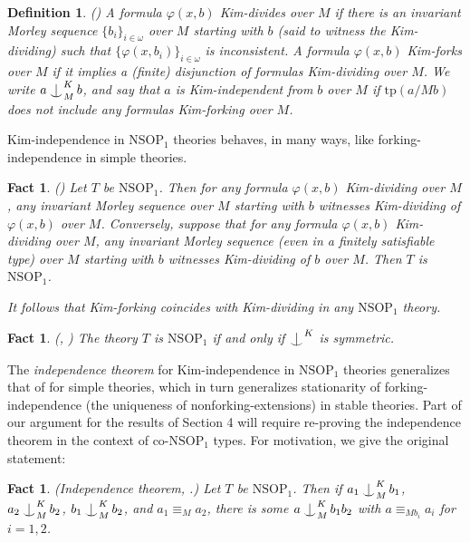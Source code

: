 \documentclass[12pt]{amsart}
\newtheorem{fact}[theorem]{Fact}
\newtheorem{definition}{Definition}[section]
\theoremstyle{definition}
\def\Ind#1#2{#1\setbox0=\hbox{$#1x$}\kern\wd0\hbox to 0pt{\hss$#1\mid$\hss}
\lower.9\ht0\hbox to 0pt{\hss$#1\smile$\hss}\kern\wd0}
\def\ind{\mathop{\mathpalette\Ind{}}}
\begin{document}
\begin{definition}(\cite{KR17})
A formula $\varphi(x, b)$ \emph{Kim-divides} over $M$ if there is an invariant Morley sequence $\{b_{i}\}_{i \in \omega}$ over $M$ starting with $b$ (said to \emph{witness} the Kim-dividing) such that $\{\varphi(x, b_{i})\}_{i \in \omega}$ is inconsistent. A formula  $\varphi(x, b)$ \emph{Kim-forks} over $M$ if it implies a (finite) disjunction of formulas Kim-dividing over $M$. We write $a \ind^{K}_{M} b$, and say that $a$ is \emph{Kim-independent} from $b$ over $M$ if $\mathrm{tp}(a/Mb)$ does not include any formulas Kim-forking over $M$.
\end{definition}

Kim-independence in $\mathrm{NSOP}_{1}$ theories behaves, in many ways, like forking-independence in simple theories.

\begin{fact}\label{4-kimslemma}
(\cite{KR17}) Let $T$ be $\mathrm{NSOP}_{1}$. Then for any formula $\varphi(x,b)$ Kim-dividing over $M$, any invariant Morley sequence over $M$ starting with $b$ witnesses Kim-dividing of $\varphi(x, b)$ over $M$. Conversely, suppose that for any formula $\varphi(x,b)$ Kim-dividing over $M$, any invariant Morley sequence (even in a finitely satisfiable type) over $M$ starting with $b$ witnesses Kim-dividing of $b$ over $M$. Then $T$ is $\mathrm{NSOP}_{1}$.

It follows that Kim-forking coincides with Kim-dividing in any $\mathrm{NSOP}_{1}$ theory.
\end{fact}

\begin{fact}\label{4-symmetry}
(\cite{CR15}, \cite{KR17}) The theory $T$ is $\mathrm{NSOP}_{1}$ if and only if $\ind^{K}$ is symmetric.
\end{fact}

The \textit{independence theorem} for Kim-independence in $\mathrm{NSOP}_{1}$ theories generalizes that of \cite{KP99} for simple theories, which in turn generalizes stationarity of forking-independence (the uniqueness of nonforking-extensions) in stable theories. Part of our argument for the results of Section 4 will require re-proving the independence theorem in the context of co-$\mathrm{NSOP}_{1}$ types. For motivation, we give the original statement:

\begin{fact}\label{4-independence}(\emph{Independence theorem, \cite{KR17}.})
    Let $T$ be $\mathrm{NSOP}_{1}$. Then if   $a_{1} \ind^{K}_{M} b_{1}$, $a_{2} \ind^{K}_{M} b_{2}$, $b_{1} \ind^{K}_{M} b_{2}$, and $a_{1} \equiv_{M} a_{2}$, there is some $a \ind^{K}_{M} b_{1}b_{2}$ with $a \equiv_{Mb_{i}}a_{i}$ for $i=1, 2$.
\end{fact}
\end{document}
